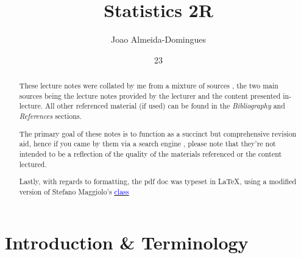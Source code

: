 \documentclass[english,course]{Notes}
\title{Statistics 2R}
\author{Joao Almeida-Domingues}
\date{23}{09}{2019}
\newcommand{\ita}[1]{\textit{#1}}
\begin{document}
\begin{abstract}
\par{These lecture notes were collated by me from a mixture of sources , the two main sources being the lecture notes provided by the lecturer and the content presented in-lecture. All other referenced material (if used) can be found in the \ita{Bibliography} and \ita{References} sections.}
\par{The primary goal of these notes is to function as a succinct but comprehensive revision aid, hence if you came by them via a search engine , please note that they're not intended to be a reflection of the quality of the materials referenced or the content lectured.}
\par{Lastly, with regards to formatting, the pdf doc was typeset in \LaTeX , using a modified version of Stefano Maggiolo's \href{http://blog.poormansmath.net/latex-class-for-lecture-notes/}{\underline{\textcolor{blue}{class}}}}
\end{abstract}

\newpage

\section{Introduction \& Terminology}










\end{document}
